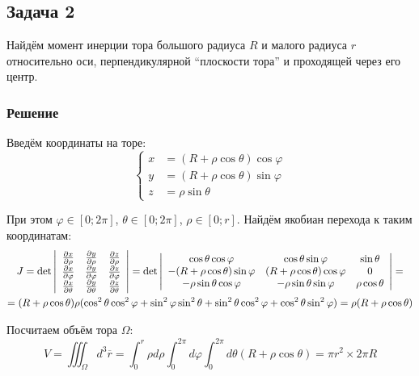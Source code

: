 \documentclass[a4paper,12pt]{article}
\begin{document}
\subsection*{Задача 2}

Найдём момент инерции тора большого радиуса $R$ и малого радиуса
$r$ относительно оси, перпендикулярной ``плоскости тора'' и проходящей через его центр.


\subsubsection*{Решение}

Введём координаты на торе:
\[
\begin{cases}
x & =(R+\rho\cos\theta)\cos\varphi\\
y & =(R+\rho\cos\theta)\sin\varphi\\
z & =\rho\sin\theta
\end{cases}
\]

 \noindent
При этом $\varphi\in\left[0;2\pi\right]$, $\theta\in\left[0;2\pi\right]$,
$\rho\in\left[0;r\right]$. Найдём якобиан перехода к таким координатам:
\begin{multline*}
J={\rm det}\left|\begin{array}{ccc}
\frac{\partial x}{\partial\rho} & \frac{\partial y}{\partial\rho} & \frac{\partial z}{\partial\rho}\\
\frac{\partial x}{\partial\varphi} & \frac{\partial y}{\partial\varphi} & \frac{\partial z}{\partial\varphi}\\
\frac{\partial x}{\partial\theta} & \frac{\partial y}{\partial\theta} & \frac{\partial z}{\partial\theta}
\end{array}\right|={\rm det}\left|\begin{array}{ccc}
\cos\theta\cos\varphi & \cos\theta\sin\varphi & \sin\theta\\
-(R+\rho\cos\theta)\sin\varphi & (R+\rho\cos\theta)\cos\varphi & 0\\
-\rho\sin\theta\cos\varphi & -\rho\sin\theta\sin\varphi & \rho\cos\theta
\end{array}\right|=\\
=(R+\rho\cos\theta)\rho(\cos^{2}\theta\cos^{2}\varphi+\sin^{2}\varphi\sin^{2}\theta+\sin^{2}\theta\cos^{2}\varphi+\cos^{2}\theta\sin^{2}\varphi)=\rho(R+\rho\cos\theta)
\end{multline*}

 \noindent
Посчитаем объём тора $\Omega$:
\[
V=\iiint_{\Omega}d^{3}\overline{r}=\int_{0}^{r}\rho d\rho\int_{0}^{2\pi}d\varphi\int_{0}^{2\pi}d\theta\left(R+\rho\cos\theta\right)=\pi r^{2}\times2\pi R
\]
\end{document}
